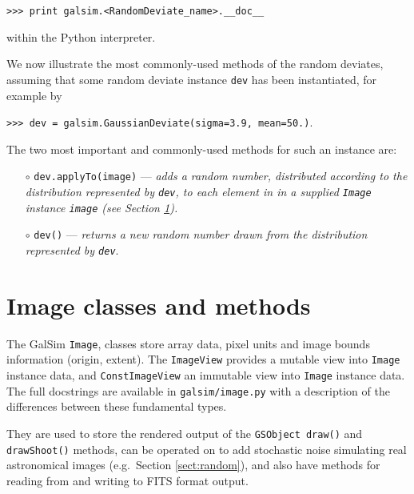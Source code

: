 \documentclass[preprint,11pt]{aastex}
\newcommand{\gsobject}{{\tt GSObject}}
\begin{document}
{\tt >>> print galsim.<RandomDeviate\_name>.\_\_doc\_\_}

within the Python interpreter.

We now illustrate the most commonly-used methods of the random
deviates, assuming that some random deviate instance \texttt{dev}
has been instantiated, for example by

{\tt >>> dev = galsim.GaussianDeviate(sigma=3.9, mean=50.)}.

The two most important and commonly-used methods for such an
instance are:
\begin{itemize}

\item[$\circ$] \texttt{dev.applyTo(image)} --- \emph{adds a random
    number,
  distributed according to the distribution represented by 
\texttt{dev}, to each element in in a supplied \texttt{Image} instance \texttt{image} (see Section \ref{sect:image}).}

\item[$\circ$] \texttt{dev()} --- \emph{returns a new random number drawn from the distribution
    represented by \texttt{dev}}.

\end{itemize}

\section{Image classes and methods}\label{sect:image}
The GalSim \texttt{Image}, classes store array data, pixel units and
image bounds information (origin, extent).  The \texttt{ImageView}
provides a mutable view into \texttt{Image} instance data, and
\texttt{ConstImageView} an immutable view into
\texttt{Image} instance data.  The full docstrings are available in
\texttt{galsim/image.py} with a description of the differences between
these fundamental types.

They are used to store the rendered output of the
\gsobject~\texttt{draw()} and \texttt{drawShoot()} methods, can be
operated on to add stochastic noise simulating real astronomical
images (e.g.\ Section \ref{sect:random}), and also have methods for
reading from and writing to FITS format output.
\end{document}
